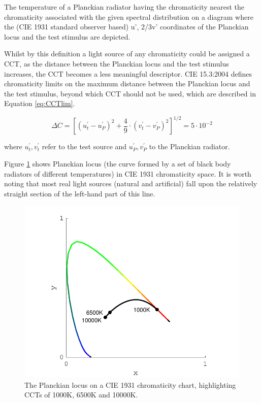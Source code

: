 \begin{itquote}{}
The temperature of a Planckian radiator having the chromaticity nearest the chromaticity associated with the given spectral distribution on a diagram where the (CIE 1931 standard observer based) u', 2/3v' coordinates of the Planckian locus and the test stimulus are depicted.
\end{itquote}

Whilst by this definition a light source of any chromaticity could be assigned a \gls{CCT}, as the distance between the Planckian locus and the test stimulus increases, the \gls{CCT} becomes a less meaningful descriptor. CIE 15.3:2004 \citep{cie_cie_2004-2} defines chromaticity limits on the maximum distance between the Planckian locus and the test stimulus, beyond which \gls{CCT} should not be used, which are described in Equation \ref{eq:CCTlim}.

\begin{equation}
\Delta C=\left[\left(u_{t}^{\prime}-u_{P}^{\prime}\right)^{2}+\frac{4}{9} \cdot\left(v_{t}^{\prime}-v_{P}^{\prime}\right)^{2}\right]^{1 / 2}=5 \cdot 10^{-2}
\label{eq:CCTlim}
\end{equation}

where $u^{\prime}_{t}, v^{\prime}_{t}$ refer to the test source and $u^{\prime}_{P}, v^{\prime}_{P}$ to the Planckian radiator.

Figure \ref{fig:BBR} shows Planckian locus (the curve formed by a set of black body radiators of different temperatures) in \gls{CIE} 1931 chromaticity space. It is worth noting that most real light sources (natural and artificial) fall upon the relatively straight section of the left-hand part of this line.

\begin{figure}[htbp]
\includegraphics[max width=\textwidth]{figs/LitRev/BBR.pdf}
\caption{The Planckian locus on a \gls{CIE} 1931 chromaticity chart, highlighting \glspl{CCT} of 1000K, 6500K and 10000K.}
\label{fig:BBR}
\end{figure}

\clearpage